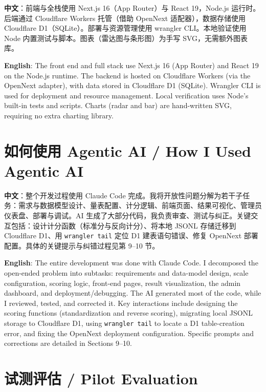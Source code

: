 \documentclass[11pt,a4paper]{ctexart}
\begin{document}
\noindent\textbf{中文}：前端与全栈使用 Next.js 16（App Router）与 React 19，Node.js 运行时。后端通过 Cloudflare Workers 托管（借助 OpenNext 适配器），数据存储使用 Cloudflare D1（SQLite）。部署与资源管理使用 wrangler CLI。本地验证使用 Node 内置测试与脚本。图表（雷达图与条形图）为手写 SVG，无需额外图表库。

\medskip

\noindent\textbf{English}: The front end and full stack use Next.js 16 (App Router) and React 19 on the Node.js runtime. The backend is hosted on Cloudflare Workers (via the OpenNext adapter), with data stored in Cloudflare D1 (SQLite). Wrangler CLI is used for deployment and resource management. Local verification uses Node's built-in tests and scripts. Charts (radar and bar) are hand-written SVG, requiring no extra charting library.

\section{如何使用 Agentic AI / How I Used Agentic AI}

\noindent\textbf{中文}：整个开发过程使用 Claude Code 完成。我将开放性问题分解为若干子任务：需求与数据模型设计、量表配置、计分逻辑、前端页面、结果可视化、管理员仪表盘、部署与调试。AI 生成了大部分代码，我负责审查、测试与纠正。关键交互包括：设计计分函数（标准分与反向计分）、将本地 JSONL 存储迁移到 Cloudflare D1、用 \texttt{wrangler tail} 定位 D1 建表语句错误、修复 OpenNext 部署配置。具体的关键提示与纠错过程见第 9--10 节。

\medskip

\noindent\textbf{English}: The entire development was done with Claude Code. I decomposed the open-ended problem into subtasks: requirements and data-model design, scale configuration, scoring logic, front-end pages, result visualization, the admin dashboard, and deployment/debugging. The AI generated most of the code, while I reviewed, tested, and corrected it. Key interactions include designing the scoring functions (standardization and reverse scoring), migrating local JSONL storage to Cloudflare D1, using \texttt{wrangler tail} to locate a D1 table-creation error, and fixing the OpenNext deployment configuration. Specific prompts and corrections are detailed in Sections 9--10.

\section{试测评估 / Pilot Evaluation}
\end{document}
